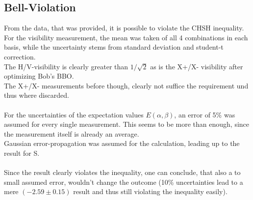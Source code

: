 \documentclass[12pt,a4paper]{article}
\begin{document}
\begin{multicols}{2}
\subsection{Bell-Violation}
From the data, that was provided, it is possible to violate the CHSH inequality.\\
For the visibility measurement, the mean was taken of all 4 combinations in each basis, while the uncertainty stems from standard deviation and student-t correction.\\
The H/V-visibility is clearly greater than $1/\sqrt{2}$ as is the X+/X- visibility after optimizing Bob's BBO.\\
The X+/X- measurements before though, clearly not suffice the requirement und thus where discarded.\\
\\
For the uncertainties of the expectation values $E(\alpha, \beta)$, an error of 5\% was assumed for every single measurement. This seems to be more than enough, since the measurement itself is already an average.\\
Gaussian error-propagation was assumed for the calculation, leading up to the result for S.\\
\\
Since the result clearly violates the inequality, one can conclude, that also a to small assumed error, wouldn't change the outcome (10\% uncertainties lead to a mere $(-2.59 \pm 0.15)$ result and thus still violating the inequality easily).






\end{multicols}
\end{document}
